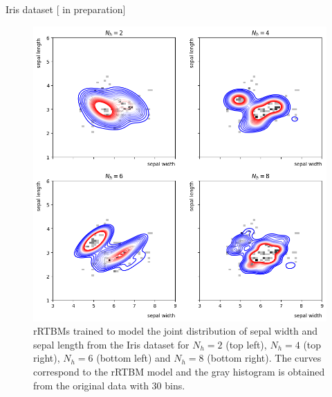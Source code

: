 \documentclass[10pt]{beamer}
\begin{document}
\begin{frame}{Iris dataset \hfill \small [\cite{new} in preparation]}

    \begin{figure}
        \includegraphics[height=0.8 \textheight]{figures/iris.png}
       
            \caption{rRTBMs trained to model the joint 
            distribution of sepal width and sepal length from the Iris dataset for $N_h = 2$ (top left), $N_h = 4$ (top right), $N_h = 6$ (bottom left) and $N_h = 8$ (bottom right).
                 The curves correspond to the rRTBM model and the gray histogram is obtained from the original data with 30 bins.}
    \end{figure}
    
    
\end{frame}
\end{document}
